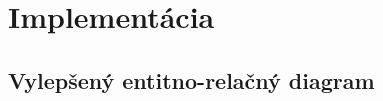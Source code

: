 \chapter{Implementácia}\label{ch:implementácia}

\section{Vylepšený entitno-relačný diagram}\label{sec:eer-diagram}
